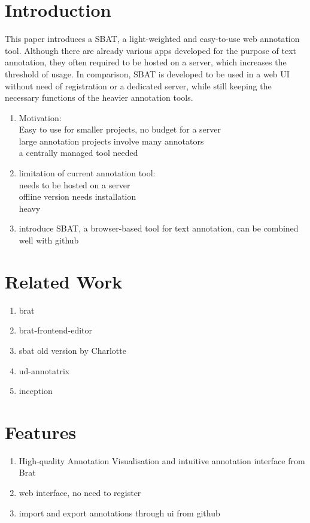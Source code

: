 \documentclass[a4paper]{article}
\begin{document}
\section{Introduction}
This paper introduces a SBAT, a light-weighted and easy-to-use web annotation tool. Although there are already various apps developed for the purpose of text annotation, they often required to be hosted on a server, which increases the threshold of usage. In comparison, SBAT is developed to be used in a web UI without need of registration or a dedicated server, while still keeping the necessary functions of the heavier annotation tools.
\begin{enumerate}
\item 
Motivation: \\
Easy to use for smaller projects, no budget for a server\\
large annotation projects involve many annotators\\
a centrally managed tool needed\\
\item limitation of current annotation tool:\\ 
needs to be hosted on a server\\
offline version needs installation\\
heavy\\
\item introduce SBAT, a browser-based tool for text annotation, can be combined well with github
\end{enumerate}
\section{Related Work}
\begin{enumerate}
\item brat
\item brat-frontend-editor
\item sbat old version by Charlotte
\item ud-annotatrix
\item inception
\end{enumerate}
\section{Features}
\begin{enumerate}
\item High-quality Annotation Visualisation and intuitive annotation interface from Brat
\item web interface, no need to register
\item import and export annotations through ui from github
\end{enumerate}
\end{document}
